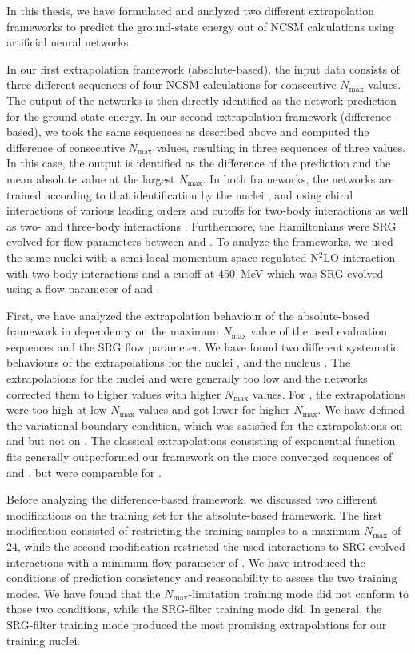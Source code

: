 In this thesis, we have formulated and analyzed two different extrapolation frameworks to predict the ground-state energy out of NCSM calculations using artificial neural networks.

In our first extrapolation framework (absolute-based), the input data consists of three different sequences of four NCSM calculations for consecutive $N_\mathrm{max}$ values. The output of the networks is then directly identified as the network prediction for the ground-state energy. In our second extrapolation framework (difference-based), we took the same sequences as described above and computed the difference of consecutive $N_\mathrm{max}$ values, resulting in three sequences of three values. In this case, the output is identified as the difference of the prediction and the mean absolute value at the largest $N_\mathrm{max}$. In both frameworks, the networks are trained according to that identification by the nuclei ,  and  using chiral interactions of various leading orders and cutoffs for two-body interactions \cite{entemmachleidt} as well as two- and three-body interactions \cite{HUTHER2020135651}. Furthermore, the Hamiltonians were SRG evolved for flow parameters between  and . To analyze the frameworks, we used the same nuclei with a semi-local momentum-space regulated N$^{2}$LO interaction with two-body interactions and a cutoff at \SI{450}{\mega\electronvolt} which was SRG evolved using a flow parameter of  and .

First, we have analyzed the extrapolation behaviour of the absolute-based framework in dependency on the maximum $N_\mathrm{max}$ value of the used evaluation sequences and the SRG flow parameter. We have found two different systematic behaviours of the extrapolations for the nuclei ,  and the nucleus . The extrapolations for the nuclei  and  were generally too low and the networks corrected them to higher values with higher $N_\mathrm{max}$ values. For , the extrapolations were too high at low $N_\mathrm{max}$ values and got lower for higher $N_\mathrm{max}$. We have defined the variational boundary condition, which was satisfied for the extrapolations on  and  but not on . The classical extrapolations consisting of exponential function fits generally outperformed our framework on the more converged sequences of  and , but were comparable for .

Before analyzing the difference-based framework, we discussed two different modifications on the training set for the absolute-based framework. The first modification consisted of restricting the training samples to a maximum $N_\mathrm{max}$ of $24$, while the second modification restricted the used interactions to SRG evolved interactions with a minimum flow parameter of . We have introduced the conditions of prediction consistency and reasonability to assess the two training modes. We have found that the $N_\mathrm{max}$-limitation training mode did not conform to those two conditions, while the SRG-filter training mode did. In general, the SRG-filter training mode produced the most promising extrapolations for our training nuclei.

